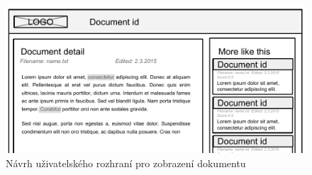 \begin{figure}[h]
\begin{center}
\includegraphics[width=13cm]{DetailLayout}
\caption{Návrh uživatelského rozhraní pro zobrazení dokumentu}
\label{fig:DetailLayout}
\end{center}
\end{figure}
